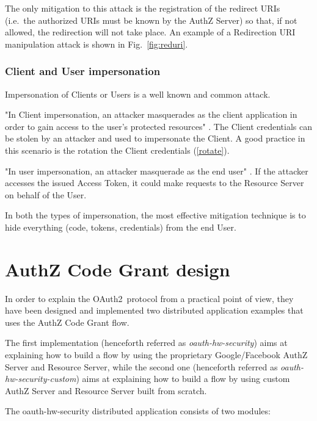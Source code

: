 \documentclass[a4paper,12pt]{article}
\def\ie{i.e.\xspace}
\def\oauth{OAuth2\xspace}
\def\myfig#1{Fig.~#1\xspace}
\begin{document}
The only mitigation to this attack is the registration of the redirect URIs (\ie\ the authorized URIs must be known by the AuthZ Server) so that, if not allowed, the redirection will not take place. An example of a Redirection URI manipulation attack is shown in \myfig{\ref{fig:reduri}}.

\subsubsection{Client and User impersonation}
Impersonation of Clients or Users is a well known and common attack.

"In Client impersonation, an attacker masquerades as the client application in order to gain access to the user's protected resources" \cite{mastering}. The Client credentials can be stolen by an attacker and used to impersonate the Client. A good practice in this scenario is the rotation the Client credentials (\ref{rotate}).

"In user impersonation, an attacker masquerade as the end user" \cite{mastering}. If the attacker accesses the issued Access Token, it could make requests to the Resource Server on behalf of the User.

In both the types of impersonation, the most effective mitigation technique is to hide everything (code, tokens, credentials) from the end User.


\section{AuthZ Code Grant design}
In order to explain the \oauth\ protocol from a practical point of view, they have been designed and implemented two distributed application examples that uses the AuthZ Code Grant flow. 

The first implementation (henceforth referred as \textit{oauth-hw-security}) aims at explaining how to build a flow by using the proprietary Google/Facebook AuthZ Server and Resource Server, while the second one (henceforth referred as \textit{oauth-hw-security-custom}) aims at explaining how to build a flow by using custom AuthZ Server and Resource Server built from scratch.

The oauth-hw-security distributed application consists of two modules:
\end{document}
